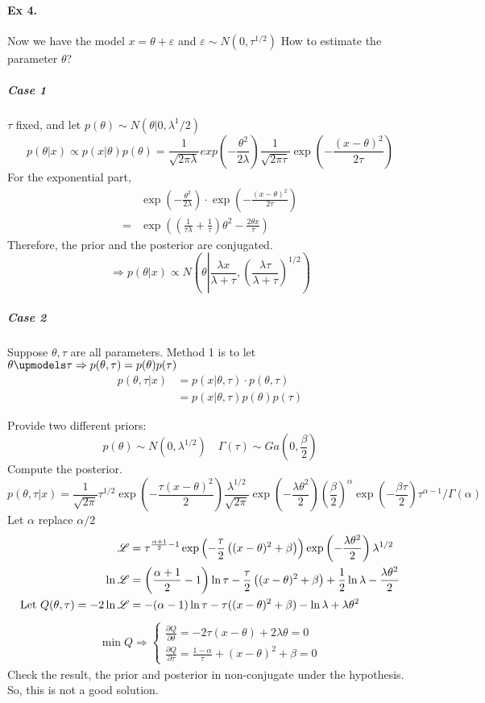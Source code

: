 	
	\paragraph{Ex 4.}  Now we have the model $x=\theta + \varepsilon$ and $\varepsilon\sim N(0,\tau^{1/2})$ How to estimate the parameter $\theta$?
	\subparagraph{Case 1} $\tau$ fixed, and let $p(\theta)\sim N(\theta| 0, \lambda^1/2)$
	$$p(\theta|x)\propto p(x|\theta)p(\theta) = \frac{1}{\sqrt{2\pi\lambda}}exp\left(-\frac{\theta^2}{2\lambda}\right)\frac{1}{\sqrt{2\pi\tau}}\exp\left(-\frac{(x-\theta)^2}{2\tau}\right)$$
	For the exponential part,
	\begin{align*}
		&\exp\left(-\frac{\theta^2}{2\lambda}\right)\cdot\exp\left(-\frac{(x-\theta)^2}{2\tau}\right)\\
		=&\exp\left(\left(\frac{1}{\tau\lambda}+\frac{1}{\tau}\right)\theta^2 - \frac{2\theta x}{\tau}\right)
	\end{align*}
	Therefore, the prior and the posterior are conjugated.
	$$\Rightarrow p(\theta|x)\propto N\left(\theta\left|\frac{\lambda x}{\lambda+\tau}, \left(\frac{\lambda\tau}{\lambda + \tau}\right)^{1/2}\right.\right)$$ 
	
	\subparagraph{Case 2} Suppose $\theta,\tau$ are all parameters. Method 1 is to let $\theta\upmodels \tau\Rightarrow p(\theta, \tau)=p(\theta)p(\tau)$
	\begin{align*}
		p(\theta, \tau|x)& = p(x|\theta, \tau)\cdot p(\theta,\tau)\\
		&=p(x|\theta, \tau)p(\theta)p(\tau)
	\end{align*}

	Provide two different priors:
	$$p(\theta)\sim N(0,\lambda^{1/2})\quad \Gamma(\tau)\sim Ga(0,\frac{\beta}{2})$$
	Compute the posterior.
	$$p(\theta, \tau|x) = \frac{1}{\sqrt{2\pi}}\tau^{1/2}\exp\left(-\frac{\tau(x-\theta)^2}{2}\right)\frac{\lambda^{1/2}}{\sqrt{2\pi}}\exp\left(-\frac{\lambda\theta^2}{2}\right)\left(\frac{\beta}{2}\right)^\alpha \exp\left(-\frac{\beta \tau}{2}\right)\tau^{\alpha-1}/\Gamma(\alpha)$$
	Let $\alpha$ replace $\alpha/2$
	\begin{align*}
		 \mathscr{L}&=\tau^{\frac{\alpha+1}{2}-1} \exp\left(-\frac{\tau}{2}\left((x-\theta)^2+\beta\right)\right)\exp\left(-\frac{\lambda\theta^2}{2}\right)\lambda^{1/2}\\
		\ln \mathscr{L} &= \left(\frac{\alpha+1}{2}-1\right)\ln \tau - \frac{\tau}{2}\left((x-\theta)^2+\beta\right)+\frac{1}{2}\ln \lambda - \frac{\lambda\theta^2}{2}\\
		\text{Let }Q(\theta, \tau) = -2\ln \mathscr{L}&= -(\alpha-1)\ln \tau - \tau ((x-\theta)^2+\beta)-\ln\lambda +\lambda \theta^2
	\end{align*}
	\begin{eqnarray}
		\min Q\Rightarrow\left\{
		\begin{array}{ll}
			\frac{\partial Q}{\partial \theta}=-2\tau(x-\theta)+2\lambda\theta=0\\
			\frac{\partial Q}{\partial \tau}=\frac{1-\alpha}{\tau}+(x-\theta)^2+\beta = 0
		\end{array}
		\right.
	\end{eqnarray}
	Check the result, the prior and posterior in non-conjugate under the hypothesis. So, this is not a good solution.
	

